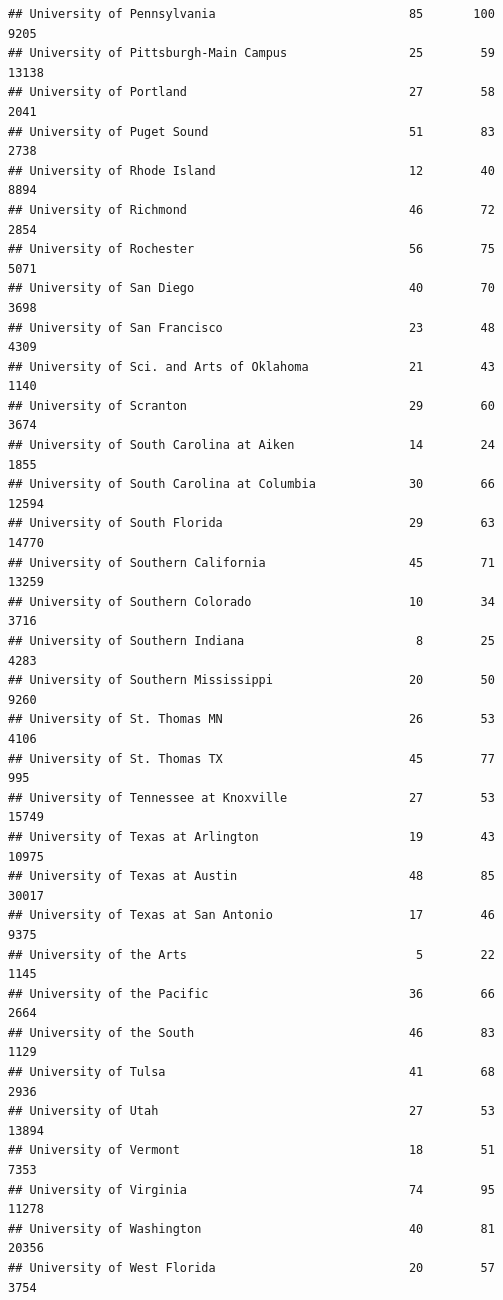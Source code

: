 \documentclass[
]{article}
\begin{document}
\begin{verbatim}
## University of Pennsylvania                           85       100        9205
## University of Pittsburgh-Main Campus                 25        59       13138
## University of Portland                               27        58        2041
## University of Puget Sound                            51        83        2738
## University of Rhode Island                           12        40        8894
## University of Richmond                               46        72        2854
## University of Rochester                              56        75        5071
## University of San Diego                              40        70        3698
## University of San Francisco                          23        48        4309
## University of Sci. and Arts of Oklahoma              21        43        1140
## University of Scranton                               29        60        3674
## University of South Carolina at Aiken                14        24        1855
## University of South Carolina at Columbia             30        66       12594
## University of South Florida                          29        63       14770
## University of Southern California                    45        71       13259
## University of Southern Colorado                      10        34        3716
## University of Southern Indiana                        8        25        4283
## University of Southern Mississippi                   20        50        9260
## University of St. Thomas MN                          26        53        4106
## University of St. Thomas TX                          45        77         995
## University of Tennessee at Knoxville                 27        53       15749
## University of Texas at Arlington                     19        43       10975
## University of Texas at Austin                        48        85       30017
## University of Texas at San Antonio                   17        46        9375
## University of the Arts                                5        22        1145
## University of the Pacific                            36        66        2664
## University of the South                              46        83        1129
## University of Tulsa                                  41        68        2936
## University of Utah                                   27        53       13894
## University of Vermont                                18        51        7353
## University of Virginia                               74        95       11278
## University of Washington                             40        81       20356
## University of West Florida                           20        57        3754

\end{verbatim}
\end{document}
